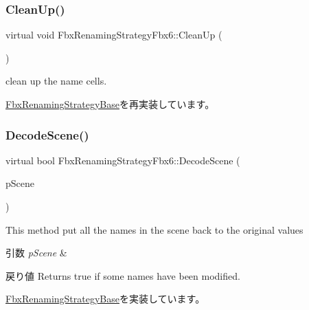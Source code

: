 \subsubsection{\texorpdfstring{Clean\+Up()}{CleanUp()}}
{\footnotesize\ttfamily virtual void Fbx\+Renaming\+Strategy\+Fbx6\+::\+Clean\+Up (\begin{DoxyParamCaption}{ }\end{DoxyParamCaption})\hspace{0.3cm}{\ttfamily [virtual]}}



clean up the name cells. 



\hyperlink{class_fbx_renaming_strategy_base_ae1ab8784f6769fce3068ee21e3c34196}{Fbx\+Renaming\+Strategy\+Base}を再実装しています。

\mbox{\label{class_fbx_renaming_strategy_fbx6_a663b913a3f88b49e847f9c9c99ab16f2}} 
\subsubsection{\texorpdfstring{Decode\+Scene()}{DecodeScene()}}
{\footnotesize\ttfamily virtual bool Fbx\+Renaming\+Strategy\+Fbx6\+::\+Decode\+Scene (\begin{DoxyParamCaption}\item[{\hyperlink{class_fbx_scene}{Fbx\+Scene} $\ast$}]{p\+Scene }\end{DoxyParamCaption})\hspace{0.3cm}{\ttfamily [virtual]}}

This method put all the names in the scene back to the original values 
\begin{DoxyParams}{引数}
{\em p\+Scene} & \\
\hline
\end{DoxyParams}
\begin{DoxyReturn}{戻り値}
Returns true if some names have been modified. 
\end{DoxyReturn}


\hyperlink{class_fbx_renaming_strategy_base_a6c368dff1424b4b54cdfa49ad49bf09c}{Fbx\+Renaming\+Strategy\+Base}を実装しています。

\mbox{\label{class_fbx_renaming_strategy_fbx6_a491fb1e1fe7f2d194059f83f49be9e19}} 
